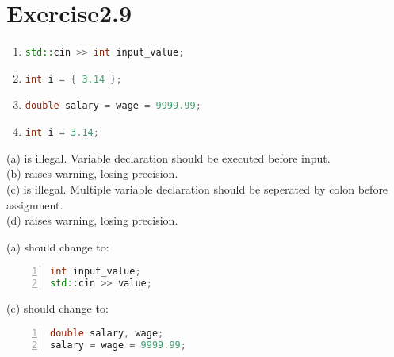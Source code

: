 \documentclass{article}
\begin{document}
\section*{Exercise2.9}

\begin{enumerate}[label=(\alph*)]
    \item \lstinline[language=C++]|std::cin >> int input_value;|
    \item \lstinline[language=C++]|int i = { 3.14 };|
    \item \lstinline[language=C++]|double salary = wage = 9999.99;|
    \item \lstinline[language=C++]|int i = 3.14;|
\end{enumerate}

\begin{flushleft}
(a) is illegal. Variable declaration should be executed before input. \\
(b) raises warning, losing precision. \\
(c) is illegal. Multiple variable declaration should be seperated by colon before assignment.\\
(d) raises warning, losing precision.
\end{flushleft}

\begin{flushleft}
(a) should change to:
\end{flushleft}

\begin{lstlisting}[language=C++, basicstyle=\ttfamily, numbers=left, xleftmargin=2em]
int input_value;
std::cin >> value;
\end{lstlisting}

\begin{flushleft}
(c) should change to:
\end{flushleft}

\begin{lstlisting}[language=C++, basicstyle=\ttfamily, numbers=left, xleftmargin=2em]
double salary, wage;
salary = wage = 9999.99;
\end{lstlisting}
\end{document}
